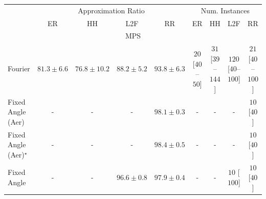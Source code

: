 \begin{tabular}{l|cccc|cccc|}
\toprule
& \multicolumn{4}{c|}{Approximation Ratio} & \multicolumn{4}{c|}{Num. Instances} \\
            & ER & HH & L2F & RR & ER & HH & L2F & RR \\
\midrule
\multicolumn{9}{c}{\rule{0pt}{8pt}MPS} \\
\midrule
Fourier & {\cellcolor[HTML]{FEEAA0}} \color[HTML]{000000} $81.3\pm 6.6$ & {\cellcolor[HTML]{FFFFE5}} \color[HTML]{000000} $76.8\pm 10.2$ & {\cellcolor[HTML]{FA8F24}} \color[HTML]{F1F1F1} $88.2\pm 5.2$ & {\cellcolor[HTML]{BC4503}} \color[HTML]{F1F1F1} $93.8\pm 6.3$ & {\cellcolor[HTML]{FFF5F1}} \color[HTML]{000000} $20$ [$40$--$50$] & {\cellcolor[HTML]{FEF1ED}} \color[HTML]{000000} $31$ [$39$--$144$] & {\cellcolor[HTML]{FDD8D5}} \color[HTML]{000000} $120$ [$40$--$100$] & {\cellcolor[HTML]{FFF4F0}} \color[HTML]{000000} $21$ [$40$--$100$] \\
Fixed Angle (Aer) & {\cellcolor[HTML]{000000}} \color[HTML]{F1F1F1} {\cellcolor{white}} \color{black} - & {\cellcolor[HTML]{000000}} \color[HTML]{F1F1F1} {\cellcolor{white}} \color{black} - & {\cellcolor[HTML]{000000}} \color[HTML]{F1F1F1} {\cellcolor{white}} \color{black} - & {\cellcolor[HTML]{6B2606}} \color[HTML]{F1F1F1} $98.1\pm 0.3$ & {\cellcolor[HTML]{000000}} \color[HTML]{F1F1F1} {\cellcolor{white}} \color{black} - & {\cellcolor[HTML]{000000}} \color[HTML]{F1F1F1} {\cellcolor{white}} \color{black} - & {\cellcolor[HTML]{000000}} \color[HTML]{F1F1F1} {\cellcolor{white}} \color{black} - & {\cellcolor[HTML]{FFF7F3}} \color[HTML]{000000} $10$ [$40$] \\
Fixed Angle (Aer)$^\star$ & {\cellcolor[HTML]{000000}} \color[HTML]{F1F1F1} {\cellcolor{white}} \color{black} - & {\cellcolor[HTML]{000000}} \color[HTML]{F1F1F1} {\cellcolor{white}} \color{black} - & {\cellcolor[HTML]{000000}} \color[HTML]{F1F1F1} {\cellcolor{white}} \color{black} - & {\cellcolor[HTML]{662506}} \color[HTML]{F1F1F1} $98.4\pm 0.5$ & {\cellcolor[HTML]{000000}} \color[HTML]{F1F1F1} {\cellcolor{white}} \color{black} - & {\cellcolor[HTML]{000000}} \color[HTML]{F1F1F1} {\cellcolor{white}} \color{black} - & {\cellcolor[HTML]{000000}} \color[HTML]{F1F1F1} {\cellcolor{white}} \color{black} - & {\cellcolor[HTML]{FFF7F3}} \color[HTML]{000000} $10$ [$40$] \\
Fixed Angle & {\cellcolor[HTML]{000000}} \color[HTML]{F1F1F1} {\cellcolor{white}} \color{black} - & {\cellcolor[HTML]{000000}} \color[HTML]{F1F1F1} {\cellcolor{white}} \color{black} - & {\cellcolor[HTML]{882F05}} \color[HTML]{F1F1F1} $96.6\pm 0.8$ & {\cellcolor[HTML]{6E2706}} \color[HTML]{F1F1F1} $97.9\pm 0.4$ & {\cellcolor[HTML]{000000}} \color[HTML]{F1F1F1} {\cellcolor{white}} \color{black} - & {\cellcolor[HTML]{000000}} \color[HTML]{F1F1F1} {\cellcolor{white}} \color{black} - & {\cellcolor[HTML]{FFF7F3}} \color[HTML]{000000} $10$ [$100$] & {\cellcolor[HTML]{FFF7F3}} \color[HTML]{000000} $10$ [$40$] \\

\end{tabular}
